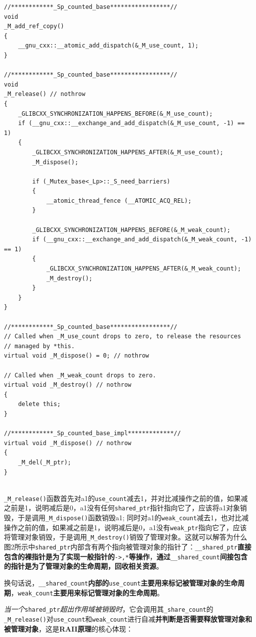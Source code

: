 \documentclass[UTF8,a4paper,12pt]{ctexbook}
\begin{document}
	\begin{lstlisting}
//************_Sp_counted_base*****************//
void
_M_add_ref_copy()
{ 
	__gnu_cxx::__atomic_add_dispatch(&_M_use_count, 1); 
}
 
//************_Sp_counted_base*****************//
void
_M_release() // nothrow
{
	_GLIBCXX_SYNCHRONIZATION_HAPPENS_BEFORE(&_M_use_count);
	if (__gnu_cxx::__exchange_and_add_dispatch(&_M_use_count, -1) == 1)
	{
		_GLIBCXX_SYNCHRONIZATION_HAPPENS_AFTER(&_M_use_count);
		_M_dispose();
		
		if (_Mutex_base<_Lp>::_S_need_barriers)
		{
			__atomic_thread_fence (__ATOMIC_ACQ_REL);
		}
		
		_GLIBCXX_SYNCHRONIZATION_HAPPENS_BEFORE(&_M_weak_count);
		if (__gnu_cxx::__exchange_and_add_dispatch(&_M_weak_count, -1) == 1)
		{
			_GLIBCXX_SYNCHRONIZATION_HAPPENS_AFTER(&_M_weak_count);
			_M_destroy();
		}
	}
}
 
//************_Sp_counted_base*****************//
// Called when _M_use_count drops to zero, to release the resources
// managed by *this.
virtual void _M_dispose() = 0; // nothrow
 
// Called when _M_weak_count drops to zero.
virtual void _M_destroy() // nothrow
{ 
	delete this; 
}
 
//************_Sp_counted_base_impl*************//
virtual void _M_dispose() // nothrow
{ 
	_M_del(_M_ptr); 
}
	
	\end{lstlisting}
	
	\verb|_M_release()|函数首先对a1的\verb|use_count|减去1，并对比减操作之前的值，如果减之前是1，说明减后是0，a1没有任何\verb|shared_ptr|指针指向它了，应该将a1对象销毁，于是调用\verb|_M_dispose()|函数销毁a1; 同时对a1的\verb|weak_count|减去1，也对比减操作之前的值，如果减之前是1，说明减后是0，a1没有\verb|weak_ptr|指向它了，应该将管理对象销毁，于是调用\verb|_M_destroy()|销毁了管理对象。这就可以解答为什么图2所示中\verb|shared_ptr|内部含有两个指向被管理对象的指针了：\verb|__shared_ptr|\textbf{直接包含的裸指针是为了实现一般指针的}\verb|->,*|\textbf{等操作}，\textbf{通过}\verb|__shared_count|\textbf{间接包含的指针是为了管理对象的生命周期，回收相关资源}。
	
	换句话说，\verb|__shared_count|\textbf{内部的}\verb|use_count|\textbf{主要用来标记被管理对象的生命周期}，\verb|weak_count|\textbf{主要用来标记管理对象的生命周期}。
	
	\textit{当一个}\verb|shared_ptr|\textit{超出作用域被销毁时}，它会调用其\verb|_share_count|的\verb|_M_release()|对\verb|use_count|和\verb|weak_count|进行自减\textbf{并判断是否需要释放管理对象和被管理对象}，这是\textbf{RAII原理}的核心体现：
	
\end{document}
